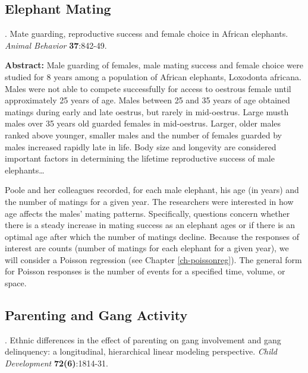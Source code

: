 \documentclass[
]{krantz}
\renewenvironment{quote}{\begin{VF}}{\end{VF}}
\begin{document}
\hypertarget{elephant-mating}{%
\subsection{Elephant Mating}\label{elephant-mating}}

\citet{Poole1989} . Mate guarding, reproductive success and female choice in African elephants. \emph{Animal Behavior} \textbf{37}:842-49.

\begin{quote}
\textbf{Abstract:} Male guarding of females, male mating success and female choice were studied for 8 years among a population of African elephants, Loxodonta africana. Males were not able to compete successfully for access to oestrous female until approximately 25 years of age. Males between 25 and 35 years of age obtained matings during early and late oestrus, but rarely in mid-oestrus. Large musth males over 35 years old guarded females in mid-oestrus. Larger, older males ranked above younger, smaller males and the number of females guarded by males increased rapidly late in life. Body size and longevity are considered important factors in determining the lifetime reproductive success of male elephants\ldots{}
\end{quote}

Poole and her colleagues recorded, for each male elephant, his age (in years) and the number of matings for a given year. The researchers were interested in how age affects the males' mating patterns. Specifically, questions concern whether there is a steady increase in mating success as an elephant ages or if there is an optimal age after which the number of matings decline. Because the responses of interest are counts (number of matings for each elephant for a given year), we will consider a Poisson regression (see Chapter \ref{ch-poissonreg}). The general form for Poisson responses is the number of events for a specified time, volume, or space.

\hypertarget{parenting-and-gang-activity}{%
\subsection{Parenting and Gang Activity}\label{parenting-and-gang-activity}}

\citet{Walker-Barnes2001} . Ethnic differences in the effect of parenting on gang involvement and gang delinquency: a longitudinal, hierarchical linear modeling perspective. \emph{Child Development} \textbf{72(6)}:1814-31.
\end{document}
